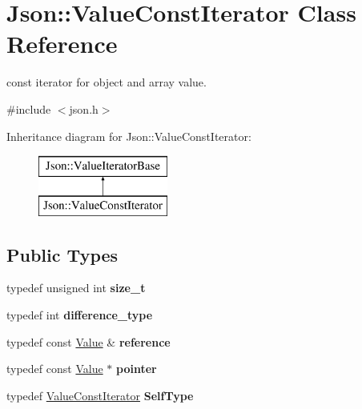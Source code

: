 \hypertarget{class_json_1_1_value_const_iterator}{\section{Json\-:\-:Value\-Const\-Iterator Class Reference}
\label{class_json_1_1_value_const_iterator}
}


const iterator for object and array value.  




{\ttfamily \#include $<$json.\-h$>$}

Inheritance diagram for Json\-:\-:Value\-Const\-Iterator\-:\begin{figure}[H]
\begin{center}
\leavevmode
\includegraphics[height=2.000000cm]{class_json_1_1_value_const_iterator}
\end{center}
\end{figure}
\subsection*{Public Types}
\begin{DoxyCompactItemize}
\item 
\hypertarget{class_json_1_1_value_const_iterator_a8685219d214dbd2b763357ae94fb0f27}{typedef unsigned int {\bfseries size\-\_\-t}}\label{class_json_1_1_value_const_iterator_a8685219d214dbd2b763357ae94fb0f27}

\item 
\hypertarget{class_json_1_1_value_const_iterator_a32b36aa9d76e2b48ca74fb6e1979a95a}{typedef int {\bfseries difference\-\_\-type}}\label{class_json_1_1_value_const_iterator_a32b36aa9d76e2b48ca74fb6e1979a95a}

\item 
\hypertarget{class_json_1_1_value_const_iterator_aa9b05c6a37cd352ea1ee6e13b816f709}{typedef const \hyperlink{class_json_1_1_value}{Value} \& {\bfseries reference}}\label{class_json_1_1_value_const_iterator_aa9b05c6a37cd352ea1ee6e13b816f709}

\item 
\hypertarget{class_json_1_1_value_const_iterator_a400136bd8bc09e9fddec0785fa2cff14}{typedef const \hyperlink{class_json_1_1_value}{Value} $\ast$ {\bfseries pointer}}\label{class_json_1_1_value_const_iterator_a400136bd8bc09e9fddec0785fa2cff14}

\item 
\hypertarget{class_json_1_1_value_const_iterator_a0c2e33e7eb5a80dd8709fb28ece83933}{typedef \hyperlink{class_json_1_1_value_const_iterator}{Value\-Const\-Iterator} {\bfseries Self\-Type}}\label{class_json_1_1_value_const_iterator_a0c2e33e7eb5a80dd8709fb28ece83933}

\end{DoxyCompactItemize}
